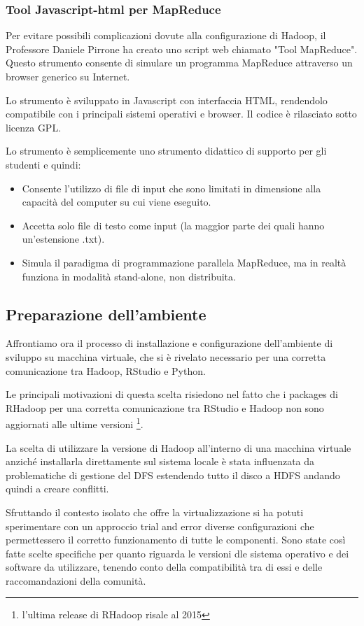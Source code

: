 \subsubsection{Tool Javascript-html per MapReduce}
Per evitare possibili complicazioni dovute alla configurazione di Hadoop, il Professore Daniele Pirrone ha creato uno script web chiamato "Tool MapReduce". Questo strumento consente di simulare un programma MapReduce attraverso un browser generico su Internet.

Lo strumento è sviluppato in Javascript con interfaccia HTML, rendendolo compatibile con i principali sistemi operativi e browser. Il codice è rilasciato sotto licenza GPL.

Lo strumento è semplicemente uno strumento didattico di supporto per gli studenti e quindi:
\begin{itemize}
    \item Consente l'utilizzo di file di input che sono limitati in dimensione alla capacità del computer su cui viene eseguito.
    \item Accetta solo file di testo come input (la maggior parte dei quali hanno un'estensione .txt).
    \item Simula il paradigma di programmazione parallela MapReduce, ma in realtà funziona in modalità stand-alone, non distribuita.
\end{itemize}


\subsection{Preparazione dell’ambiente}
Affrontiamo ora il processo di installazione e configurazione dell'ambiente di sviluppo su macchina virtuale, che si è rivelato necessario per una corretta comunicazione tra Hadoop, RStudio e Python.

Le principali motivazioni di questa scelta risiedono nel fatto che i packages di RHadoop per una corretta comunicazione tra RStudio e Hadoop non sono aggiornati alle ultime versioni \footnote{l’ultima release di RHadoop risale al 2015}.

La scelta di utilizzare la versione di Hadoop all'interno di una macchina virtuale anziché installarla direttamente sul sistema locale è stata influenzata da problematiche di gestione del DFS estendendo tutto il disco a HDFS andando quindi a creare conflitti.

Sfruttando il contesto isolato che offre la virtualizzazione si ha potuti sperimentare con un approccio trial and error diverse configurazioni che permettessero il corretto funzionamento di tutte le componenti. Sono state così fatte scelte specifiche per quanto riguarda le versioni dle sistema operativo e dei software da utilizzare, tenendo conto della compatibilità tra di essi e delle raccomandazioni della comunità.

